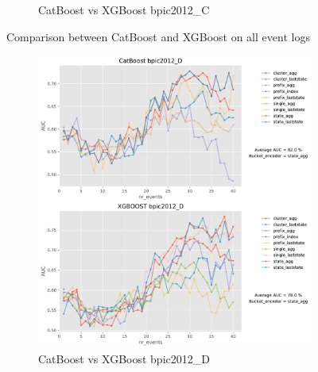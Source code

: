 \begin{figure}[!htb]
\begin{subfigure}{0.48\textwidth}
		\caption{CatBoost vs XGBoost bpic2012\_C} \label{fig:b12c}
	\end{subfigure}
	\caption{Comparison between CatBoost and XGBoost on all event logs}
\label{fig:r1}
\end{figure}



\begin{figure}[!htb] %
	
	\begin{subfigure}{0.48\textwidth}
		\includegraphics[width=\linewidth]{images/catboost/graphs/bpic2012_D_CatBoost_xgboost.pdf}
		\caption{CatBoost vs XGBoost bpic2012\_D} \label{fig:b12d}
	\end{subfigure}\hspace*{\fill}
	\begin{subfigure}{0.48\textwidth}

\end{subfigure}
\end{figure}
